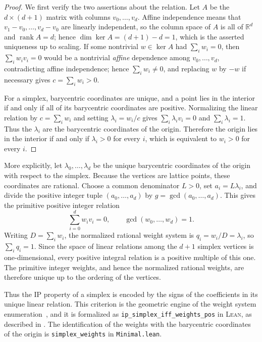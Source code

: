 \documentclass[appliedmath,article,submit,moreauthors]{Definitions/mdpi}
\newcommand{\RR}{\mathbb{R}}
\newcommand{\Lean}{\textsc{Lean}}
\begin{document}
\begin{proof}
{\color{blue}We first verify the two assertions about the relation. Let \(A\) be
the \(d\times(d+1)\) matrix with columns \(v_0,\ldots,v_d\). Affine
independence means that \(v_1-v_0,\ldots,v_d-v_0\) are linearly independent, so
the column space of \(A\) is all of \(\RR^d\) and \(\operatorname{rank}A=d\); hence
\(\dim\ker A=(d+1)-d=1\), which is the asserted uniqueness up to scaling. If
some nontrivial \(w\in\ker A\) had \(\sum_iw_i=0\), then \(\sum_iw_iv_i=0\)
would be a nontrivial \emph{affine} dependence among \(v_0,\ldots,v_d\),
contradicting affine independence; hence \(\sum_iw_i\neq0\), and replacing
\(w\) by \(-w\) if necessary gives \(c=\sum_iw_i>0\).}

For a simplex, barycentric coordinates are unique, and a point lies in the
interior if and only if all of its barycentric coordinates are positive.
Normalizing the linear relation by \(c=\sum_i w_i\) and setting
\(\lambda_i=w_i/c\) gives \(\sum_i \lambda_i v_i=0\) and \(\sum_i \lambda_i=1\).
Thus the \(\lambda_i\) are the barycentric coordinates of the origin. Therefore
the origin lies in the interior if and only if \(\lambda_i>0\) for every \(i\),
which is equivalent to \(w_i>0\) for every \(i\).
\end{proof}

{\color{blue}
More explicitly, let \(\lambda_0,\ldots,\lambda_d\) be the unique barycentric
coordinates of the origin with respect to the simplex. Because the vertices are
lattice points, these coordinates are rational. Choose a common denominator
\(L>0\), set \(a_i=L\lambda_i\), and divide the positive integer tuple
\((a_0,\ldots,a_d)\) by \(g=\gcd(a_0,\ldots,a_d)\). This gives the primitive
positive integer relation
\[
    \sum_{i=0}^{d}w_i v_i=0,
    \qquad
    \gcd(w_0,\ldots,w_d)=1.
\]
Writing \(D=\sum_i w_i\), the normalized rational weight system is
\(q_i=w_i/D=\lambda_i\), so \(\sum_iq_i=1\). Since the space of linear
relations among the \(d+1\) simplex vertices is one-dimensional, every positive
integral relation is a positive multiple of this one. The primitive integer
weights, and hence the normalized rational weights, are therefore unique up to
the ordering of the vertices.
}

Thus the IP property of a simplex is encoded by the signs of the coefficients in
its unique {\color{blue}linear relation}.  This criterion is the geometric engine of the
weight system enumeration~\cite{Skarke1996,Scholler2019}, and it is formalized
as \nolinkurl{ip\_simplex\_iff\_weights\_pos} in \Lean, as described in
.  The identification of the weights with the
barycentric coordinates of the origin is \nolinkurl{simplex\_weights} in
\nolinkurl{Minimal.lean}.
\end{document}
